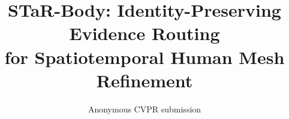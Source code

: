 \documentclass[10pt,twocolumn,letterpaper]{article}
\title{STaR-Body: Identity-Preserving Evidence Routing\\for Spatiotemporal Human Mesh Refinement}
\author{Anonymous CVPR submission}
\begin{document}
\maketitle







{
    \small
    
    
}
\end{document}
